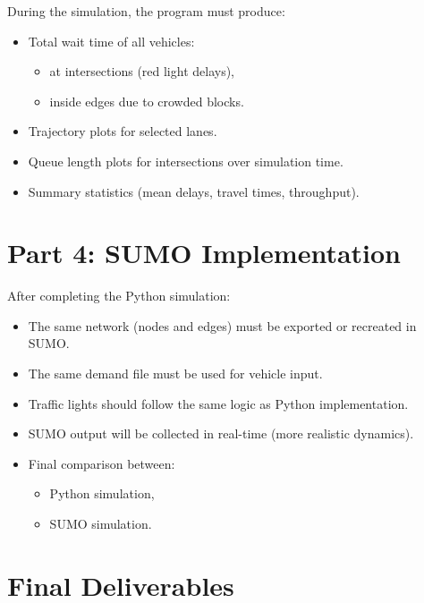 \documentclass{KPS_assignment}
\begin{document}
During the simulation, the program must produce:
\begin{itemize}
    \item Total wait time of all vehicles:
    \begin{itemize}
        \item at intersections (red light delays),
        \item inside edges due to crowded blocks.
    \end{itemize}
    \item Trajectory plots for selected lanes.
    \item Queue length plots for intersections over simulation time.
    \item Summary statistics (mean delays, travel times, throughput).
\end{itemize}

\section*{Part 4: SUMO Implementation}

After completing the Python simulation:
\begin{itemize}
    \item The same network (nodes and edges) must be exported or recreated in SUMO.
    \item The same demand file must be used for vehicle input.
    \item Traffic lights should follow the same logic as Python implementation.
    \item SUMO output will be collected in real-time (more realistic dynamics).
    \item Final comparison between:
    \begin{itemize}
        \item Python simulation,
        \item SUMO simulation.
    \end{itemize}
\end{itemize}

\section*{Final Deliverables}
\end{document}
